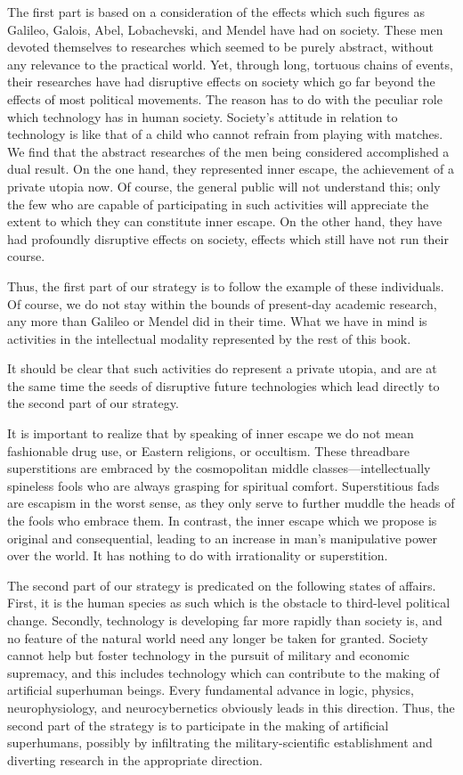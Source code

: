 The first part is based on a consideration of the effects which such 
figures as Galileo, Galois, Abel, Lobachevski, and Mendel have had on 
society. These men devoted themselves to researches which seemed to be 
purely abstract, without any relevance to the practical world. Yet, through 
long, tortuous chains of events, their researches have had disruptive effects 
on society which go far beyond the effects of most political movements. The 
reason has to do with the peculiar role which technology has in human 
society. Society's attitude in relation to technology is like that of a child 
who cannot refrain from playing with matches. We find that 
the abstract researches of the men being considered accomplished a dual 
result. On the one hand, they represented inner escape, the achievement of a 
private utopia now. Of course, the general public will not understand this; 
only the few who are capable of participating in such activities will 
appreciate the extent to which they can constitute inner escape. On the 
other hand, they have had profoundly disruptive effects on society, effects 
which still have not run their course. 

Thus, the first part of our strategy is to follow the example of these 
individuals. Of course, we do not stay within the bounds of present-day 
academic research, any more than Galileo or Mendel did in their time. What 
we have in mind is activities in the intellectual modality represented by the 
rest of this book. 

It should be clear that such activities do represent a private utopia, and are at 
the same time the seeds of disruptive future technologies which lead directly 
to the second part of our strategy. 

It is important to realize that by speaking of inner escape we do not 
mean fashionable drug use, or Eastern religions, or occultism. These 
threadbare superstitions are embraced by the cosmopolitan middle 
classes---intellectually spineless fools who are always grasping for spiritual 
comfort. Superstitious fads are escapism in the worst sense, as they only 
serve to further muddle the heads of the fools who embrace them. In 
contrast, the inner escape which we propose is original and consequential, 
leading to an increase in man's manipulative power over the world. It has 
nothing to do with irrationality or superstition. 

The second part of our strategy is predicated on the following states of 
affairs. First, it is the human species as such which is the obstacle to 
third-level political change. Secondly, technology is developing far more 
rapidly than society is, and no feature of the natural world need any longer 
be taken for granted. Society cannot help but foster technology in the 
pursuit of military and economic supremacy, and this includes technology 
which can contribute to the making of artificial superhuman beings. Every 
fundamental advance in logic, physics, neurophysiology, and 
neurocybernetics obviously leads in this direction. Thus, the second part of 
the strategy is to participate in the making of artificial superhumans, 
possibly by infiltrating the military-scientific establishment and diverting 
research in the appropriate direction. 

